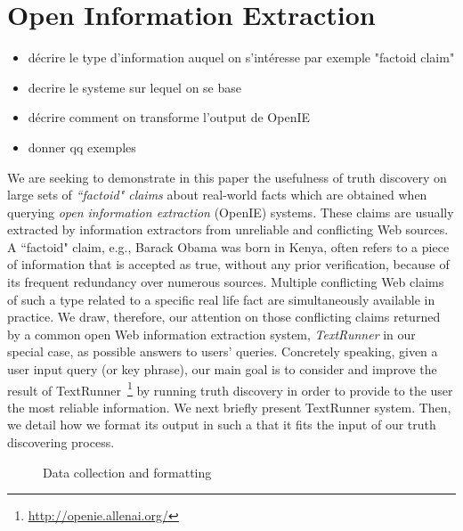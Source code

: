 \section{Open Information Extraction}\label{openie}
\begin{itemize}
 \item décrire le type d'information auquel on s'intéresse par exemple "factoid claim"
 \item decrire le systeme sur lequel on se base
 \item décrire comment on transforme l'output de OpenIE
 \item donner qq exemples
\end{itemize}

\medskip

We are seeking to demonstrate in this paper the usefulness of truth discovery on large sets of 
\emph{``factoid" claims} about real-world facts which are obtained when querying \emph{open information
extraction} (OpenIE) systems. These claims are usually extracted by information extractors from unreliable
and conflicting Web sources.
A ``factoid" claim, e.g.,  \textsf{Barack Obama was born in Kenya}, often refers to a piece of 
information that is accepted as true, without any prior verification, because of its frequent redundancy
over numerous sources. Multiple conflicting Web claims of such a type related to a specific real life fact 
are simultaneously available in practice. We draw, therefore, our attention on those conflicting claims 
returned by a common open Web information extraction system, \emph{TextRunner} in our special case, as possible answers to users' queries. 
Concretely speaking, given a user input query (or key phrase), our main goal is to consider and improve the result of TextRunner~\footnote{\href{http://openie.allenai.o, rg/}{http://openie.allenai.org/}}
by running truth discovery in order to provide to the user the most reliable information.
We next briefly present TextRunner system. Then, we detail how we format its output in such a that
it fits the input of our truth discovering process.


\begin{figure*}[!ht]
\begin{subfigure}[TextRunner Extraction]{Un exemple d'extraction avec TextRunner}
\end{subfigure}
\hfill
\begin{subfigure}[Extracted Triplets]{Un exemple de tripl\'es extraites}
\end{subfigure}
\label{open}\caption{Data collection and formatting}
\end{figure*}

